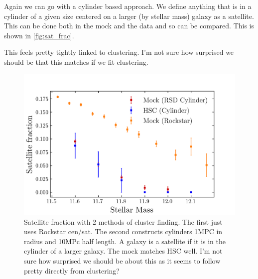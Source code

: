 \documentclass{article}
\begin{document}
Again we can go with a cylinder based approach. We define anything that is in a cylinder of a given size centered on a larger (by stellar mass) galaxy as a satellite. This can be done both in the mock and the data and so can be compared. This is shown in \autoref{fig:sat_frac}.

This feels pretty tightly linked to clustering. I'm not sure how surprised we should be that this matches if we fit clustering.


\begin{figure}[h]
    \includegraphics[width=\textwidth]{images/sat_frac.png}
    \caption{Satellite fraction with 2 methods of cluster finding. The first just uses Rockstar cen/sat. The second constructs cylinders 1MPC in radius and 10MPc half length. A galaxy is a satellite if it is in the cylinder of a larger galaxy. The mock matches HSC well.
        I'm not sure how surprised we should be about this as it seems to follow pretty directly from clustering?
    \label{fig:sat_frac}
}
\end{figure}
\end{document}
